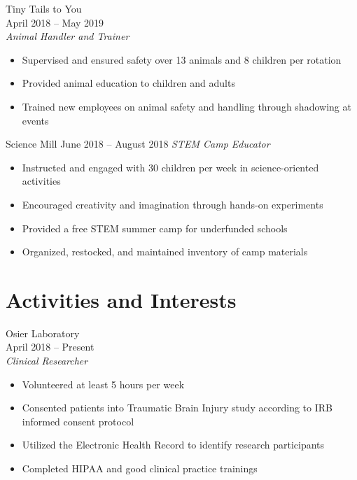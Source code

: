 \documentclass[]{article}
\providecommand{\tightlist}{%
  \setlength{\itemsep}{0pt}\setlength{\parskip}{0pt}}
\begin{document}
Tiny Tails to You\\
April 2018 -- May 2019\\
\emph{Animal Handler and Trainer}

\begin{itemize}
\tightlist
\item
  Supervised and ensured safety over 13 animals and 8 children per
  rotation\\
\item
  Provided animal education to children and adults\\
\item
  Trained new employees on animal safety and handling through shadowing
  at events
\end{itemize}

Science Mill June 2018 -- August 2018 \emph{STEM Camp Educator}

\begin{itemize}
\tightlist
\item
  Instructed and engaged with 30 children per week in science-oriented
  activities\\
\item
  Encouraged creativity and imagination through hands-on experiments\\
\item
  Provided a free STEM summer camp for underfunded schools\\
\item
  Organized, restocked, and maintained inventory of camp materials
\end{itemize}

\section{Activities and Interests}\label{activities-and-interests}

Osier Laboratory\\
April 2018 -- Present\\
\emph{Clinical Researcher}

\begin{itemize}
\tightlist
\item
  Volunteered at least 5 hours per week\\
\item
  Consented patients into Traumatic Brain Injury study according to IRB
  informed consent protocol\\
\item
  Utilized the Electronic Health Record to identify research
  participants\\
\item
  Completed HIPAA and good clinical practice trainings
\end{itemize}
\end{document}
